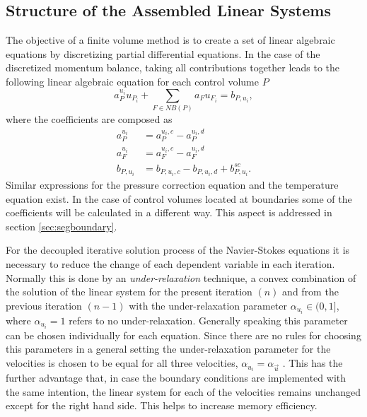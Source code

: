 \subsection{Structure of the Assembled Linear Systems}
\label{sec:structure}

The objective of a finite volume method is to create a set of linear algebraic equations by discretizing partial differential equations. In the case of the discretized momentum balance, taking all contributions together leads to the following linear algebraic equation for each control volume \(P\)
\begin{displaymath}
  a_P^{u_i} u_{P_i} + \sum_{F \in NB(P)} a_F u_{F_i} = b_{P,u_i},
\end{displaymath}
where the coefficients are composed as
\begin{subequations}
\begin{align}
  a_P^{u_i} &= a_P^{u_i,c} - a_P^{u_i,d} \\
  a_F^{u_i} &= a_F^{u_i,c} - a_F^{u_i,d} \\
  b_{P,u_i} &= b_{P,u_i,c} - b_{P,u_i,d} + b_{P,u_i}^{sc}.
\end{align}
\end{subequations}
Similar expressions for the pressure correction equation and the temperature equation exist. In the case of control volumes located at boundaries some of the coefficients will be calculated in a different way. This aspect is addressed in section \ref{sec:segboundary}.

For the decoupled iterative solution process of the Navier-Stokes equations it is necessary to reduce the change of each dependent variable in each iteration. Normally this is done by an \emph{under-relaxation} technique, a convex combination of the solution of the linear system for the present iteration \((n)\) and from the previous iteration \((n-1)\) with the under-relaxation parameter \(\alpha_{u_i} \in (0,1]\), where \(\alpha_{u_i} = 1\) refers to no under-relaxation. Generally speaking this parameter can be chosen individually for each equation. Since there are no rules for choosing this parameters in a general setting the under-relaxation parameter for the velocities is chosen to be equal for all three velocities, \(\alpha_{u_i} = \alpha_{\vec{u}}\) \cite{schaefer99}. This has the further advantage that, in case the boundary conditions are implemented with the same intention, the linear system for each of the velocities remains unchanged except for the right hand side. This helps to increase memory efficiency.

